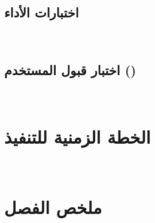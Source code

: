 \subsection{اختبارات الأداء}
\label{subsec:performance-tests}
~

\subsection{اختبار قبول المستخدم ()}
\label{subsec:uat}
~

\section{الخطة الزمنية للتنفيذ}
\label{sec:impl-schedule}
~

\section{ملخص الفصل}
\label{sec:impl-summary}
~

